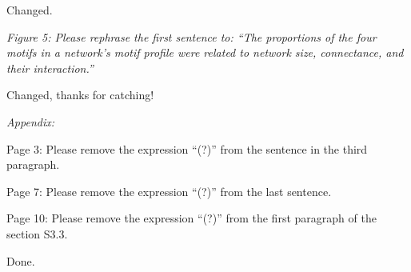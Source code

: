 \documentclass[12pt]{article}
\newcommand{\us}{\rm \setlength{\leftskip}{0.3cm} \setlength{\rightskip}{0.3cm}}
\newcommand{\them}{\it \setlength{\leftskip}{0cm} \setlength{\rightskip}{0cm}}
\begin{document}
        \us
        Changed.
        
        \them
        Figure 5: Please rephrase the first sentence to: “The proportions of the four motifs in a network's motif profile were related to network size, connectance, and their interaction.”
        
        \us
        Changed, thanks for catching!
        
        \them
        Appendix:
        
        Page 3: Please remove the expression “(?)” from the sentence in the third paragraph.
        
        Page 7: Please remove the expression “(?)” from the last sentence.
        
        Page 10: Please remove the expression “(?)” from the first paragraph of the section S3.3.
        
        \us
        Done.
\end{document}
